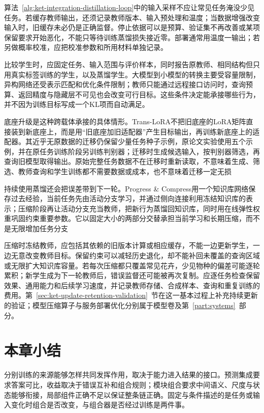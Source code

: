算法~\ref{alg:ket-integration-distillation-loop}中的输入采样不应让常见任务淹没少见任务。若缓存教师输出，还须记录教师版本、输入预处理和温度；当数据增强改变输入时，旧缓存未必仍是正确监督。停止依据可以是预算、验证集不再改善或某项保留要求开始恶化，不能只等待训练蒸馏损失接近零。部署通常用温度一输出；若另做概率校准，应把校准参数和所用材料单独记录。

比较学生时，应固定任务、输入范围与评价样本，同时报告原教师、相同结构但只用真实标签训练的学生，以及蒸馏学生。大模型到小模型的转换主要受容量限制，异构网络还受表示匹配和优化条件限制；教师只能通过远程接口访问时，查询预算、返回精度与隐藏层不可见也会改变可行目标。这些条件决定能承接哪些行为，并不因为训练目标写成一个KL项而自动满足。

底座升级是这种跨载体承接的具体情形。Trans-LoRA不把旧底座的LoRA矩阵直接装到新底座上，而是用“旧底座加旧适配器”产生目标输出，再训练新底座上的适配器。其近乎无原数据的迁移仍保留少量任务种子示例，原论文实验使用五个示例，并在原任务训练阶段另训练判别器；迁移时生成候选输入，按判别器筛选，再查询旧模型取得输出。原始完整任务数据不在迁移时重新读取，不意味着生成、筛选、教师查询和学生训练都不需要数据或成本，也不意味着迁移一定无损

持续使用蒸馏还会把误差带到下一轮。Progress \& Compress用一个知识库网络保存过去经验，当前任务先由活动分支学习，并通过侧向连接利用冻结知识库的表示；压缩阶段再让活动分支充当教师，把新行为蒸馏回知识库，同时用在线弹性权重巩固约束重要参数。它以固定大小的两部分交替承担当前学习和长期压缩，而不是无限增加任务分支

压缩时冻结教师，应包括其依赖的旧版本计算或相应缓存，不能一边更新学生，一边无意改变教师目标。保留约束可以减轻历史退化，却不能补回未覆盖的查询区域或无限扩大知识库容量。若每次压缩都只覆盖常见花卉，少见物种的偏差可能逐轮累积；新学生成为下一轮教师后，错误监督还可能被再次复制。应逐任务检查保留效果、通用能力和后续学习速度，并记录教师存储、合成样本、查询和重复训练的费用。第~\ref{sec:ket-update-retention-validation}~节在这一基本过程上补充持续更新的验证；模型压缩算子与服务部署优化分别属于模型卷及第~\ref{part:systems}~部分。

\section{本章小结}
\label{sec:ket-integration-summary}

分别训练的来源能够怎样共同发挥作用，取决于能力进入结果的接口。预测集成要求答案可比，收益取决于错误互补和组合规则；模块组合要求中间语义、尺度与状态能够衔接，局部组件正确不足以保证整条链正确。固定与条件描述的是任务或输入变化时组合是否改变，与组合器是否经过训练是两件事。

